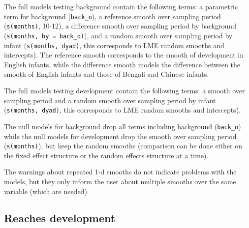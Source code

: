 \documentclass[]{article}
\newenvironment{Shaded}{\begin{snugshade}}{\end{snugshade}}
\newcommand{\DataTypeTok}[1]{\textcolor[rgb]{0.13,0.29,0.53}{#1}}
\newcommand{\FloatTok}[1]{\textcolor[rgb]{0.00,0.00,0.81}{#1}}
\newcommand{\KeywordTok}[1]{\textcolor[rgb]{0.13,0.29,0.53}{\textbf{#1}}}
\newcommand{\NormalTok}[1]{#1}
\newcommand{\OperatorTok}[1]{\textcolor[rgb]{0.81,0.36,0.00}{\textbf{#1}}}
\newcommand{\StringTok}[1]{\textcolor[rgb]{0.31,0.60,0.02}{#1}}
\begin{document}
The full models testing background contain the following terms: a
parametric term for background (\texttt{back\_o}), a reference smooth
over sampling period (\texttt{s(months)}, 10-12), a difference smooth
over sampling period by background
(\texttt{s(months,\ by\ =\ back\_o)}), and a random smooth over sampling
period by infant (\texttt{s(months,\ dyad)}, this corresponds to LME
random smooths and intercepts). The reference smooth corresponds to the
smooth of development in English infants, while the difference smooth
models the difference between the smooth of English infants and those of
Bengali and Chinese infants.

The full models testing development contain the following terms: a
smooth over sampling period and a random smooth over sampling period by
infant (\texttt{s(months,\ dyad)}, this corresponds to LME random
smooths and intercepts).

The null models for background drop all terms including background
(\texttt{back\_o}) while the null models for development drop the smooth
over sampling period (\texttt{s(months)}), but keep the random smooths
(comparison can be done either on the fixed effect structure or the
random effects structure at a time).

The warnings about repeated 1-d smooths do not indicate problems with
the models, but they only inform the user about multiple smooths over
the same variable (which are needed).

\hypertarget{reaches-development}{%
\subsection{Reaches development}\label{reaches-development}}

\begin{Shaded}
\end{Shaded}
\end{document}

